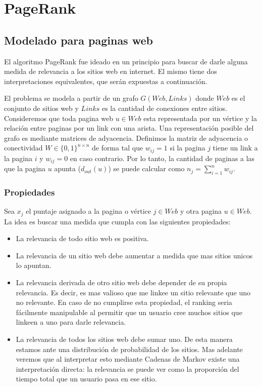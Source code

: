 \section{PageRank}

\subsection{Modelado para paginas web}

El algoritmo PageRank fue ideado en un principio para buscar de darle alguna medida de relevancia a los sitios web en internet. El mismo tiene dos interpretaciones equivalentes, que serán expuestas a continuación.

El problema se modela a partir de un grafo $G(Web,Links)$ donde $Web$ es el conjunto de sitios web y $Links$ es la cantidad de conexiones entre sitios. Consideremos que toda pagina web $u \in Web$ esta representada por un vértice y la relación entre paginas por un link con una arista. Una representación posible del grafo es mediante matrices de adyacencia. Definimos la matriz de adyacencia o conectividad $W \in \{0,1\}^{n \times n}$ de forma tal que $w_{ij} = 1$ si la pagina $j$ tiene un link a la pagina $i$ y $w_{ij} = 0$ en caso contrario. Por lo tanto, la cantidad de paginas a las que la pagina $u$ apunta ($d_{out}(u)$) se puede calcular como $n_j = \sum_{i=1}^{n} w_{ij}$.

\subsubsection{Propiedades}

Sea $x_j$ el puntaje asignado a la pagina o vértice $j \in Web$ y otra pagina $u \in Web$. La idea es buscar una medida que cumpla con las siguientes propiedades:
\begin{itemize}
  \item La relevancia de todo sitio web es positiva.
  \item La relevancia de un sitio web debe aumentar a medida que mas sitios unicos lo apuntan.
  \item La relevancia derivada de otro sitio web debe depender de su propia relevancia. Es decir, es mas valioso que me linkee un sitio relevante que uno no relevante. En caso de no cumplirse esta propiedad, el ranking seria fácilmente manipulable al permitir que un usuario cree muchos sitios que linkeen a uno para darle relevancia.
  \item La relevancia de todos los sitios web debe sumar uno. De esta manera estamos ante una distribución de probabilidad de los sitios. Mas adelante veremos que al interpretar esto mediante Cadenas de Markov existe una interpretación directa: la relevancia se puede ver como la proporción del tiempo total que un usuario pasa en ese sitio.
\end{itemize} 

